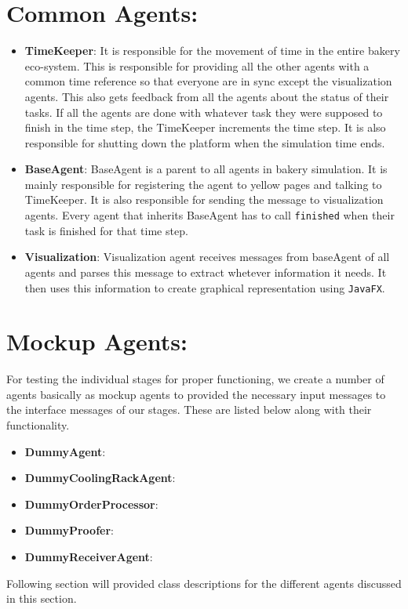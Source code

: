 \documentclass[12pt]{article}
\begin{document}
\section{Common Agents:}
\begin{itemize}
    \item \textbf{TimeKeeper}: 
 It is responsible for the movement of time in the entire bakery eco-system.
 This is responsible for providing all the other agents with a common time reference so that everyone are in sync except the visualization agents.
 This also gets feedback from all the agents about the status of their tasks.
 If all the agents are done with whatever task they were supposed to finish in the time step, the TimeKeeper increments the time step. 
 It is also responsible for shutting down the platform when the simulation time ends.
\item \textbf{BaseAgent}:
BaseAgent is a parent to all agents in bakery simulation.
It is mainly responsible for registering the agent to yellow pages and talking to TimeKeeper.
It is also responsible for sending the message to visualization agents.
Every agent that inherits BaseAgent has to call \texttt{finished} when their task is finished for that time step.
\item \textbf{Visualization}:
Visualization agent receives messages from baseAgent of all agents and parses this message to extract whetever information it needs.
It then uses this information to create graphical representation using \texttt{JavaFX}.
\end{itemize}

\section{Mockup Agents:}
For testing the individual stages for proper functioning, we create a number of agents basically as mockup agents to provided the necessary input messages to the interface messages of our stages. These are listed below along with their functionality.
\begin{itemize}
    \item \textbf{DummyAgent}:
    \item \textbf{DummyCoolingRackAgent}:
    \item \textbf{DummyOrderProcessor}:
    \item \textbf{DummyProofer}:
    \item \textbf{DummyReceiverAgent}:
\end{itemize}

Following section will provided class descriptions for the different agents discussed in this section.
\end{document}
